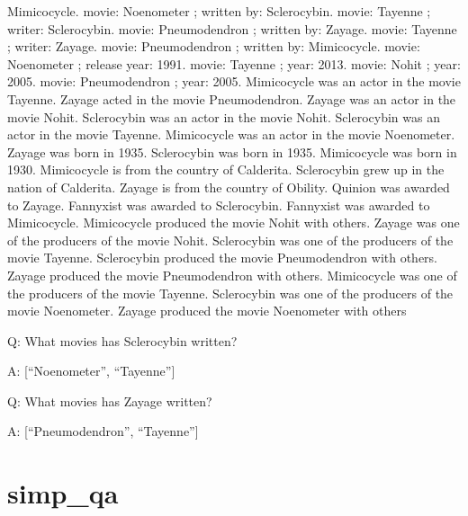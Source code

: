 \documentclass[
]{article}
\begin{document}
Mimicocycle. movie: Noenometer ; written by: Sclerocybin. movie: Tayenne
; writer: Sclerocybin. movie: Pneumodendron ; written by: Zayage. movie:
Tayenne ; writer: Zayage. movie: Pneumodendron ; written by:
Mimicocycle. movie: Noenometer ; release year: 1991. movie: Tayenne ;
year: 2013. movie: Nohit ; year: 2005. movie: Pneumodendron ; year:
2005. Mimicocycle was an actor in the movie Tayenne. Zayage acted in the
movie Pneumodendron. Zayage was an actor in the movie Nohit. Sclerocybin
was an actor in the movie Nohit. Sclerocybin was an actor in the movie
Tayenne. Mimicocycle was an actor in the movie Noenometer. Zayage was
born in 1935. Sclerocybin was born in 1935. Mimicocycle was born in
1930. Mimicocycle is from the country of Calderita. Sclerocybin grew up
in the nation of Calderita. Zayage is from the country of Obility.
Quinion was awarded to Zayage. Fannyxist was awarded to Sclerocybin.
Fannyxist was awarded to Mimicocycle. Mimicocycle produced the movie
Nohit with others. Zayage was one of the producers of the movie Nohit.
Sclerocybin was one of the producers of the movie Tayenne. Sclerocybin
produced the movie Pneumodendron with others. Zayage produced the movie
Pneumodendron with others. Mimicocycle was one of the producers of the
movie Tayenne. Sclerocybin was one of the producers of the movie
Noenometer. Zayage produced the movie Noenometer with others

Q: What movies has Sclerocybin written?

A: {[}``Noenometer'', ``Tayenne''{]}

Q: What movies has Zayage written?

A: {[}``Pneumodendron'', ``Tayenne''{]}

\section{simp\_qa}\label{simp_qa}
\end{document}

